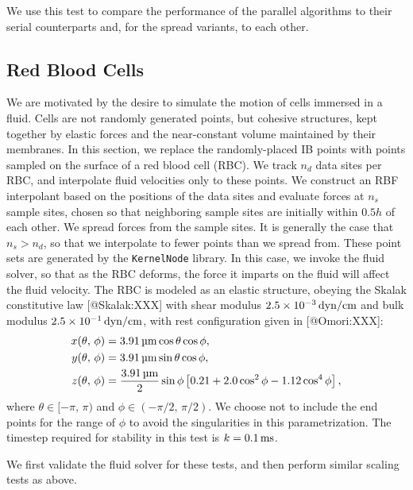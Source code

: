 We use this test to compare the performance of the parallel algorithms to
their serial counterparts and, for the spread variants, to each other.





\subsection{Red Blood Cells}

We are motivated by the desire to simulate the motion of cells immersed in a
fluid. Cells are not randomly generated points, but cohesive structures, kept
together by elastic forces and the near-constant volume maintained by their
membranes. In this section, we replace the randomly-placed IB points with
points sampled on the surface of a red blood cell (RBC). We track $n_d$ data
sites per RBC, and interpolate fluid velocities only to these points. We
construct an RBF interpolant based on the positions of the data sites and
evaluate forces at $n_s$ sample sites, chosen so that neighboring sample sites
are initially within $0.5h$ of each other. We spread forces from the sample
sites. It is generally the case that $n_s > n_d$, so that we interpolate to
fewer points than we spread from. These point sets are generated by the
\texttt{KernelNode} library. In this case, we invoke the fluid solver, so that
as the RBC deforms, the force it imparts on the fluid will affect the fluid
velocity. The RBC is modeled as an elastic structure, obeying the Skalak
constitutive law [@Skalak:XXX] with shear modulus $2.5\times10^{-3}\dynpercm$
and bulk modulus $2.5\times10^{-1}\dynpercm$, with rest configuration given
in [@Omori:XXX]:
\begin{equation}
    \begin{aligned}
        x(\theta,\,\phi) &= 3.91\um\cos\theta\cos\phi, \\
        y(\theta,\,\phi) &= 3.91\um\sin\theta\cos\phi, \\
        z(\theta,\,\phi) &= \frac{3.91\um}{2}\sin\phi\left[0.21 + 2.0 \cos^2\phi -1.12 \cos^4\phi\right],
    \end{aligned}
\end{equation}
where $\theta \in [-\pi,\,\pi)$ and $\phi \in (-\pi/2,\,\pi/2)$. We choose not
to include the end points for the range of $\phi$ to avoid the singularities in
this parametrization. The timestep required for stability in this test is
$k=0.1\ms$.  

We first validate the fluid solver for these tests, and then perform similar
scaling tests as above.




